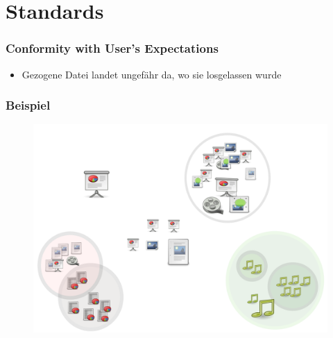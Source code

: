 \section{Standards}
\label{standards}

\begin{frame}

\frametitle{Conformity with User's Expectations}
\label{conformitywithusersexpectations}

\begin{itemize}
\item Gezogene Datei landet ungefähr da, wo sie losgelassen wurde

\end{itemize}

\end{frame}

\begin{frame}

\frametitle{Beispiel}
\label{beispiel}

\begin{figure}[htbp]
\centering
\includegraphics[keepaspectratio,width=\textwidth,height=0.75\textheight]{06.png}
\label{}
\end{figure}


\end{frame}


